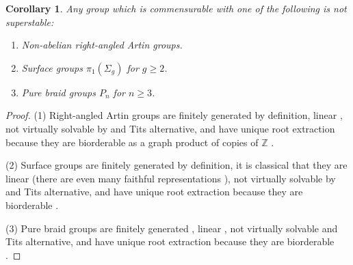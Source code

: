 \documentclass[11pt]{amsart}
\theoremstyle{plain}
\newtheorem{corollary}[theorem]{Corollary}
\theoremstyle{definition}
\theoremstyle{remark}
\numberwithin{equation}{section}
\begin{document}
\begin{corollary}
    Any group which is commensurable with one of the following is not superstable:
    \begin{enumerate}
        \item Non-abelian right-angled Artin groups.
        \item Surface groups $\pi_1(\Sigma_g)$ for $g\geq 2$.
        \item Pure braid groups $P_n$ for $n\geq 3$.
    \end{enumerate}
\end{corollary}
\begin{proof}
    (1) Right-angled Artin groups are finitely generated by definition, linear \cite[Corollary 3.6]{HsWi:linear-graph}, not virtually solvable by \cite[Theorem 1.2]{Ba:semifree} and Tits alternative, and have unique root extraction because they are biorderable as a graph product of copies of $\mathbb{Z}$ \cite{Ch:graphproductsorder}.

    (2)  Surface groups are finitely generated by definition, it is classical that they are linear (there are even many faithful representations \cite{DeKe:surfacelinear}), not virtually solvable by \cite[Second footnote]{Pu:commutator} and Tits alternative, and have unique root extraction because they are biorderable \cite[Theorem 3.11]{ClRo:order}.

    (3) Pure braid groups are finitely generated \cite[Corollary 1.19]{KaTu:Braid}, linear \cite[Theorem 3.18]{KaTu:Braid}, not virtually solvable \cite[Theorem 1.16]{KaTu:Braid} and Tits alternative, and have unique root extraction because they are biorderable \cite[Theorem 7.8]{KaTu:Braid}.
\end{proof}






\end{document}
